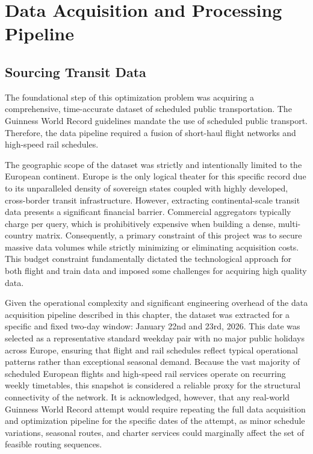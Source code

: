 \chapter{Data Acquisition and Processing Pipeline}
\label{chap:data_pipeline}

\section{Sourcing Transit Data}
\label{sec:sourcing_data}
The foundational step of this optimization problem was acquiring a comprehensive, time-accurate dataset of scheduled public transportation. The Guinness World Record guidelines mandate the use of scheduled public transport. Therefore, the data pipeline required a fusion of short-haul flight networks and high-speed rail schedules.

\medskip

\noindent The geographic scope of the dataset was strictly and intentionally limited to the European continent. Europe is the only logical theater for this specific record due to its unparalleled density of sovereign states coupled with highly developed, cross-border transit infrastructure. However, extracting continental-scale transit data presents a significant financial barrier. Commercial aggregators typically charge per query, which is prohibitively expensive when building a dense, multi-country matrix. Consequently, a primary constraint of this project was to secure massive data volumes while strictly minimizing or eliminating acquisition costs. This budget constraint fundamentally dictated the technological approach for both flight and train data and imposed some challenges for acquiring high quality data.

\medskip

Given the operational complexity and significant engineering overhead of the data acquisition pipeline described in this chapter, the dataset was extracted for a specific and fixed two-day window: January 22nd and 23rd, 2026. This date was selected as a representative standard weekday pair with no major public holidays across Europe, ensuring that flight and rail schedules reflect typical operational patterns rather than exceptional seasonal demand. Because the vast majority of scheduled European flights and high-speed rail services operate on recurring weekly timetables, this snapshot is considered a reliable proxy for the structural connectivity of the network. It is acknowledged, however, that any real-world Guinness World Record attempt would require repeating the full data acquisition and optimization pipeline for the specific dates of the attempt, as minor schedule variations, seasonal routes, and charter services could marginally affect the set of feasible routing sequences.

